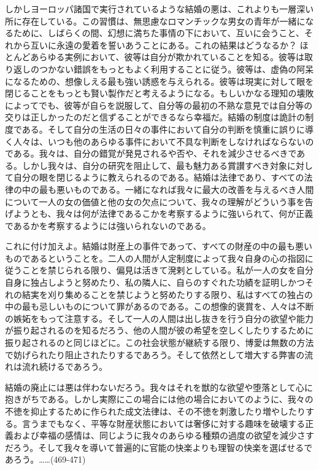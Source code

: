 しかしヨーロッパ諸国で実行されているような結婚の悪は、これよりも一層深い所に存在している。この習慣は、無思慮なロマンチックな男女の青年が一緒になるために、しばらくの間、幻想に満ちた事情の下において、互いに会うこと、それから互いに永遠の愛着を誓いあうことにある。これの結果はどうなるか？ ほとんどあらゆる実例において、彼等は自分が欺かれていることを知る。彼等は取り返しのつかない錯誤をもっともよく利用することに従う。彼等は、虚偽の阿呆になるための、想像しえる最も強い誘惑を与えられる。彼等は現実に対して眼を閉じることをもっとも賢い製作だと考えるようになる。もしいかなる理知の壊敗によってでも、彼等が自らを説服して、自分等の最初の不熟な意見では自分等の交りは正しかったのだと信ずることができるなら幸福だ。結婚の制度は詭計の制度である。そして自分の生活の日々の事件において自分の判断を慎重に誤りに導く人々は、いつも他のあらゆる事件において不具な判断をしなければならないのである。我々は、自分の錯覚が発見されるや否や、それを減少させるべきである。しかし我々は、自分の研究を阻止して、最も魅力ある賞讃すべき対象に対して自分の眼を閉じるように教えられるのである。結婚は法律であり、すべての法律の中の最も悪いものである。一緒になれば我々に最大の改善を与えるべき人間について一人の女の価値と他の女の欠点について、我々の理解がどういう事を告げようとも、我々は何が法律であるこかを考察するように強いられて、何が正義であるかを考察するようには強いられないのである。

これに付け加えよ。結婚は財産上の事件であって、すべての財産の中の最も悪いものであるということを。二人の人間が人定制度によって我々自身の心の指図に従うことを禁じられる限り、偏見は活きて溌剌としている。私が一人の女を自分自身に独占しようと努めたり、私の隣人に、自らのすぐれた功績を証明しかつそれの結実を刈り集めることを禁じようと努めたりする限り、私はすべての独占の中の最も忌しいものについて罪があるのである。この想像的褒賞を、人々は不断の嫉妬をもって注意する。そして一人の人間は出し抜きを行う自分の欲望や能力が振り起されるのを知るだろう、他の人間が彼の希望を空しくしたりするために振り起されるのと同じほどに。この社会状態が継続する限り、博愛は無数の方法で妨げられたり阻止されたりするであろう。そして依然として増大する弊害の流れは流れ続けるであろう。

結婚の廃止には悪は伴わないだろう。我々はそれを獣的な欲望や堕落として心に抱きがちである。しかし実際にこの場合には他の場合においてのように、我々の不徳を抑止するために作られた成文法律は、その不徳を刺激したり増やしたりする。言うまでもなく、平等な財産状態においては奢侈に対する趣味を破壊する正義および幸福の感情は、同じように我々のあらゆる種類の過度の欲望を減少さすだろう。そして我々を導いて普遍的に官能の快楽よりも理智の快楽を選ばせるであろう。……(469-471)



